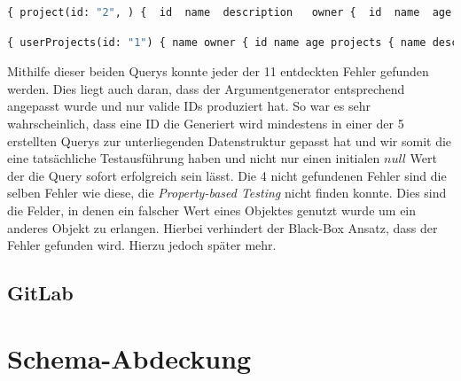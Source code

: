 \begin{lstlisting}[language=GraphQL]
    { project(id: "2", ) {  id  name  description   owner {  id  name  age   }  }  }
\end{lstlisting}

\begin{lstlisting}[language=GraphQL]
    { userProjects(id: "1") { name owner { id name age projects { name description id } } } }
\end{lstlisting}

Mithilfe dieser beiden Querys konnte jeder der 11 entdeckten Fehler gefunden werden.
Dies liegt auch daran, dass der Argumentgenerator entsprechend angepasst wurde und nur valide IDs produziert hat.
So war es sehr wahrscheinlich, dass eine ID die Generiert wird mindestens in einer der 5 erstellten Querys zur unterliegenden Datenstruktur gepasst hat
und wir somit die eine tatsächliche Testausführung haben und nicht nur einen initialen $null$ Wert der die Query sofort erfolgreich sein lässt.
Die 4 nicht gefundenen Fehler sind die selben Fehler wie diese, die \textit{Property-based Testing} \cite[vgl. RQ.2]{property-based-testing} nicht finden konnte.
Dies sind die Felder, in denen ein falscher Wert eines Objektes genutzt wurde um ein anderes Objekt zu erlangen.
Hierbei verhindert der Black-Box Ansatz, dass der Fehler gefunden wird.
Hierzu jedoch später mehr.

\subsection{GitLab}





\section{Schema-Abdeckung}


